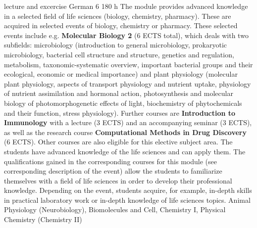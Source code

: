{lecture and excercise}
{German}
{6}
{180 h}
{The module provides advanced knowledge in a selected field of life sciences (biology, chemistry, pharmacy). These are acquired in selected events of biology, chemistry or pharmacy. These selected events include e.g. \textbf{Molecular Biology 2} (6 ECTS total), which deals with two subfields: microbiology (introduction to general microbiology, prokaryotic microbiology, bacterial cell structure and structure, genetics and regulation, metabolism, taxonomic-systematic overview, important bacterial groups and their ecological, economic or medical importance) and plant physiology (molecular plant physiology, aspects of transport physiology and nutrient uptake, physiology of nutrient assimilation and hormonal action, photosynthesis and molecular biology of photomorphogenetic effects of light, biochemistry of phytochemicals and their function, stress physiology). Further courses are \textbf{Introduction to Immunology} with a lecture (3 ECTS) and an accompanying seminar (3 ECTS), as well as the research course \textbf{Computational Methods in Drug Discovery} (6 ECTS). Other courses are also eligible for this elective subject area.}
{The students have advanced knowledge of the life sciences and can apply them. The qualifications gained in the corresponding courses for this module (see corresponding description of the event) allow the students to familiarize themselves with a field of life sciences in order to develop their professional knowledge. Depending on the event, students acquire, for example, in-depth skills in practical laboratory work or in-depth knowledge of life sciences topics.}
{Animal Physiology (Neurobiology), Biomolecules and Cell, Chemistry I, Physical Chemistry (Chemistry II)}